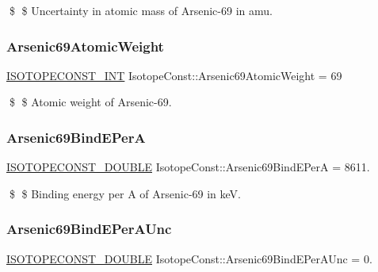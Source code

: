\$ \$ Uncertainty in atomic mass of Arsenic-\/69 in amu. \mbox{\label{group___isotope_const-_arsenic-_as69_ga039e82ee99b80af1409ef2d7a324a291}} 
\subsubsection{\texorpdfstring{Arsenic69\+Atomic\+Weight}{Arsenic69AtomicWeight}}
{\footnotesize\ttfamily \mbox{\hyperlink{group___isotope_const-_macros_ga5f18360b3e99483a35c32d789e62621c}{I\+S\+O\+T\+O\+P\+E\+C\+O\+N\+S\+T\+\_\+\+I\+NT}} Isotope\+Const\+::\+Arsenic69\+Atomic\+Weight = 69}

\$ \$ Atomic weight of Arsenic-\/69. \mbox{\label{group___isotope_const-_arsenic-_as69_ga705487d00aaac1c0b3dea83c8e106e9f}} 
\subsubsection{\texorpdfstring{Arsenic69\+Bind\+E\+PerA}{Arsenic69BindEPerA}}
{\footnotesize\ttfamily \mbox{\hyperlink{group___isotope_const-_macros_ga8f45a7272ce02c0b4c65c44636ed719a}{I\+S\+O\+T\+O\+P\+E\+C\+O\+N\+S\+T\+\_\+\+D\+O\+U\+B\+LE}} Isotope\+Const\+::\+Arsenic69\+Bind\+E\+PerA = 8611.}

\$ \$ Binding energy per A of Arsenic-\/69 in keV. \mbox{\label{group___isotope_const-_arsenic-_as69_ga979c2ffe45fed32ecffe73aba1dfe3ba}} 
\subsubsection{\texorpdfstring{Arsenic69\+Bind\+E\+Per\+A\+Unc}{Arsenic69BindEPerAUnc}}
{\footnotesize\ttfamily \mbox{\hyperlink{group___isotope_const-_macros_ga8f45a7272ce02c0b4c65c44636ed719a}{I\+S\+O\+T\+O\+P\+E\+C\+O\+N\+S\+T\+\_\+\+D\+O\+U\+B\+LE}} Isotope\+Const\+::\+Arsenic69\+Bind\+E\+Per\+A\+Unc = 0.}

